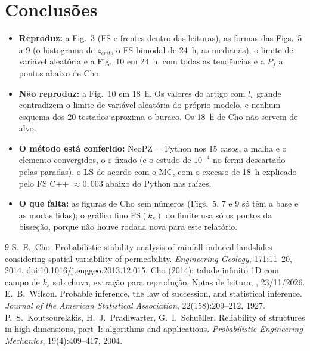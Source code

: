 \documentclass[11pt,a4paper]{article}
\begin{document}
\section{Conclusões}
\begin{itemize}
  \item \textbf{Reproduz:} a Fig.~3 (FS e frentes dentro das leituras), as formas das Figs.~5 a 9 (o histograma de
    $z_{crit}$, o FS bimodal de 24~h, as medianas), o limite de variável aleatória e a Fig.~10 em 24~h, com todas as
    tendências e a $P_f$ \difVqMin{} a \difVqMax{} pontos abaixo de Cho.
  \item \textbf{Não reproduz:} a Fig.~10 em 18~h. Os valores do artigo com $l_v$ grande contradizem o limite de variável
    aleatória do próprio modelo, e nenhum esquema dos 20 testados aproxima o buraco. Os 18~h de Cho não servem de alvo.
  \item \textbf{O método está conferido:} NeoPZ = Python nos 15 casos, a malha e o elemento convergidos, o $\varepsilon$
    fixado (e o estudo de $10^{-4}$ no fermi descartado pelas paradas), o LS de acordo com o MC, com o excesso de 18~h
    explicado pelo FS C++ $\approx 0{,}003$ abaixo do Python nas raízes.
  \item \textbf{O que falta:} as figuras de Cho sem números (Figs.~5, 7 e 9 só têm a base e as modas lidas); o gráfico
    fino FS$(k_s)$ do limite usa só os pontos da bisseção, porque não houve rodada nova para este relatório.
\end{itemize}

\begin{thebibliography}{9}
 S.~E.~Cho. Probabilistic stability analysis of rainfall-induced landslides considering spatial
  variability of permeability. \emph{Engineering Geology}, 171:11--20, 2014. doi:10.1016/j.enggeo.2013.12.015.
 Cho (2014): talude infinito 1D com campo de $k_s$ sob chuva, extração para reprodução. Notas de leitura,
  , 23/11/2026.
 E.~B.~Wilson. Probable inference, the law of succession, and statistical inference.
  \emph{Journal of the American Statistical Association}, 22(158):209--212, 1927.
 P.~S.~Koutsourelakis, H.~J.~Pradlwarter, G.~I.~Schuëller. Reliability of structures in
  high dimensions, part~I: algorithms and applications. \emph{Probabilistic Engineering Mechanics}, 19(4):409--417, 2004.
\end{thebibliography}

\appendix
\end{document}
